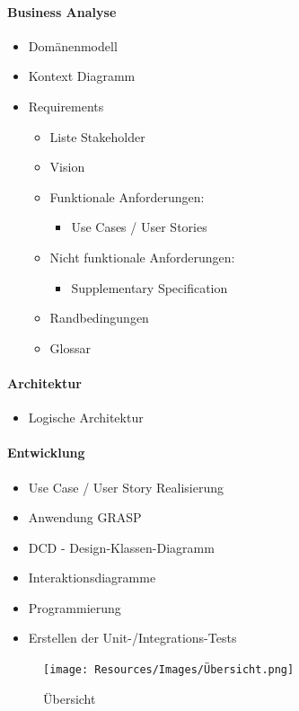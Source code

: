 \documentclass{article}
\begin{document}
\paragraph{Business Analyse}
\begin{itemize}
	\item Domänenmodell
	\item Kontext Diagramm
	\item Requirements
	\begin{itemize}
		\item Liste Stakeholder
		\item Vision
		\item Funktionale Anforderungen:
		\begin{itemize}
			\item Use Cases / User Stories
		\end{itemize}
		\item Nicht funktionale Anforderungen:
		\begin{itemize}
			\item Supplementary Specification
		\end{itemize}
		\item Randbedingungen
		\item Glossar
	\end{itemize}
\end{itemize}

\paragraph{Architektur}
\begin{itemize}
	\item Logische Architektur
\end{itemize}

\paragraph{Entwicklung}
\begin{itemize}
	\item Use Case / User Story Realisierung
	\item Anwendung GRASP
	\item DCD - Design-Klassen-Diagramm
	\item Interaktionsdiagramme
	\item Programmierung
	\item Erstellen der Unit-/Integrations-Tests
\end{itemize}

\begin{figure}[H]
\centering				\texttt{[image: Resources/Images/Übersicht.png]}
\caption{\label{fig:Übersicht}Übersicht}
\end{figure} 
\end{document}
